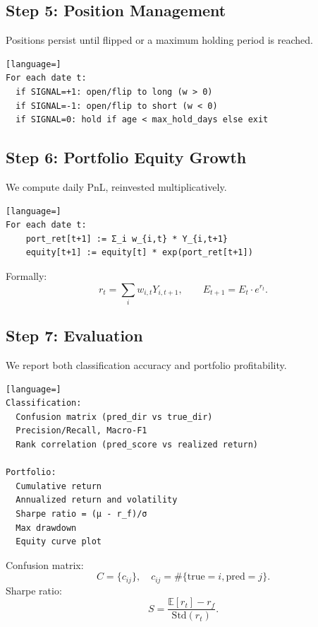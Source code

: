 \documentclass[11pt]{article}
\begin{document}
    \subsection*{Step 5: Position Management}
    Positions persist until flipped or a maximum holding period is reached.
    \begin{lstlisting}[language=]
For each date t:
  if SIGNAL=+1: open/flip to long (w > 0)
  if SIGNAL=-1: open/flip to short (w < 0)
  if SIGNAL=0: hold if age < max_hold_days else exit
    \end{lstlisting}

    \subsection*{Step 6: Portfolio Equity Growth}
    We compute daily PnL, reinvested multiplicatively.
    \begin{lstlisting}[language=]
For each date t:
    port_ret[t+1] := Σ_i w_{i,t} * Y_{i,t+1}
    equity[t+1] := equity[t] * exp(port_ret[t+1])
    \end{lstlisting}
    Formally:
    \[
       r_t = \sum_i w_{i,t} Y_{i,t+1},
       \qquad
       E_{t+1} = E_t \cdot e^{r_t}.
    \]

    \subsection*{Step 7: Evaluation}
    We report both classification accuracy and portfolio profitability.
    \begin{lstlisting}[language=]
Classification:
  Confusion matrix (pred_dir vs true_dir)
  Precision/Recall, Macro-F1
  Rank correlation (pred_score vs realized return)

Portfolio:
  Cumulative return
  Annualized return and volatility
  Sharpe ratio = (μ - r_f)/σ
  Max drawdown
  Equity curve plot
    \end{lstlisting}
    Confusion matrix:
    \[
      C = \{c_{ij}\}, \quad
      c_{ij} = \#\{\text{true}=i, \text{pred}=j\}.
    \]
    Sharpe ratio:
    \[
      S = \frac{\mathbb{E}[r_t] - r_f}{\mathrm{Std}(r_t)}.
    \]
\end{document}
